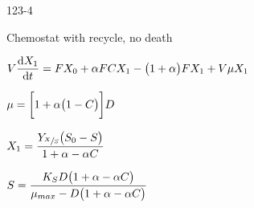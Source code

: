 \begin{mitframe}{123-4}
 \begin{listone}
	\item Chemostat with recycle, no death
    \item $\vol\dfrac{\mathrm{d}X_1}{\mathrm{d}\timet}=\force{X}_{\init}+\tdiff\force\conc{X_1}-\big(1+\tdiff\big)\force{X_1}+\vol\chempot{X_1}$
    	\begin{listtwo}
        	\item $\chempot=\bigg[1+\tdiff\big(1-\conc\big)\bigg]\elecdisplace$
            \item$X_1=\dfrac{Y_{\sfrac{X}{\entropy}}\big(\entropy_{\init}-\entropy\big)}{1+\tdiff-\tdiff\conc}$
        \end{listtwo}
	\item $\entropy=\dfrac{\dilfac_{\entropy}\elecdisplace\big(1+\tdiff-\tdiff\conc\big)}{\chempot_{max}-\elecdisplace\big(1+\tdiff-\tdiff\conc\big)}$
    
\end{listone}
\end{mitframe}